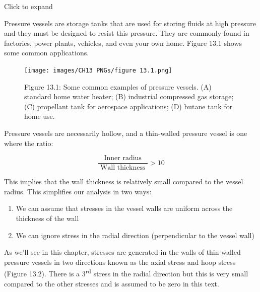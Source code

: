 \documentclass[
  letterpaper,
  DIV=11,
  numbers=noendperiod]{scrreprt}
\providecommand{\tightlist}{%
  \setlength{\itemsep}{0pt}\setlength{\parskip}{0pt}}\usepackage{longtable,booktabs,array}
\theoremstyle{definition}
\theoremstyle{remark}
\begin{document}
Click to expand

Pressure vessels are storage tanks that are used for storing fluids at
high pressure and they must be designed to resist this pressure. They
are commonly found in factories, power plants, vehicles, and even your
own home. Figure 13.1 shows some common applications.

\begin{figure}[H]

{\centering \texttt{[image: images/CH13 PNGs/figure 13.1.png]}

}

\caption{Figure 13.1: Some common examples of pressure vessels. (A)
standard home water heater; (B) industrial compressed gas storage; (C)
propellant tank for aerospace applications; (D) butane tank for home
use.}

\end{figure}%

Pressure vessels are necessarily hollow, and a thin-walled pressure
vessel is one where the ratio:

\[
\frac{\text { Inner radius }}{\text { Wall thickness }}>10
\]

This implies that the wall thickness is relatively small compared to the
vessel radius. This simplifies our analysis in two ways:

\begin{enumerate}
\def\labelenumi{\arabic{enumi}.}
\tightlist
\item
  We can assume that stresses in the vessel walls are uniform across the
  thickness of the wall
\item
  We can ignore stress in the radial direction (perpendicular to the
  vessel wall)
\end{enumerate}

As we'll see in this chapter, stresses are generated in the walls of
thin-walled pressure vessels in two directions known as the axial stress
and hoop stress (Figure 13.2). There is a 3\textsuperscript{rd} stress
in the radial direction but this is very small compared to the other
stresses and is assumed to be zero in this text.
\end{document}
